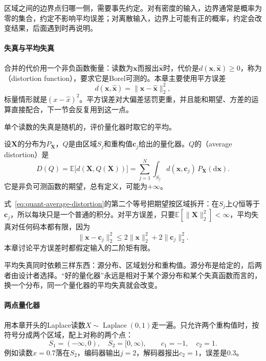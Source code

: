 区域之间的边界点归哪一侧，需要事先约定。对有密度的输入，边界通常是概率为零的集合，约定不影响平均误差；对离散输入，边界上可能有正的概率，约定会改变结果，后面遇到时再说明。

\paragraph{失真与平均失真}

合并的代价用一个非负函数衡量：读数为$\bm{x}$而报出$\hat{\bm{x}}$时，代价是$d(\bm{x},\hat{\bm{x}})\geq0$，称为（distortion function），要求它是Borel可测的。本章主要使用平方误差
\begin{equation}
 d(\bm{x},\hat{\bm{x}})=\lVert\bm{x}-\hat{\bm{x}}\rVert_2^2 ,
 \label{eq:quant-squared-error}
\end{equation}
标量情形就是$(x-\hat{x})^2$。平方误差对大偏差惩罚更重，并且能和期望、方差的运算直接配合，下一节会反复用到这一点。

单个读数的失真是随机的，评价量化器时取它的平均。

\begin{definition}[平均失真]
\label{def:quant-average-distortion}
设$\bm{X}$的分布为$P_{\bm{X}}$，$Q$是由区域$S_j$和重构值$\bm{c}_j$给出的量化器。$Q$的（average distortion）是
\begin{equation}
 D(Q)=\mathbb{E}\bigl[d(\bm{X},Q(\bm{X}))\bigr]=\sum_{j=1}^{N}\int_{S_j}d(\bm{x},\bm{c}_j)\,P_{\bm{X}}(\mathrm{d}\bm{x}) .
 \label{eq:quant-average-distortion}
\end{equation}
它是非负可测函数的期望，总有定义，可能为$+\infty$。
\end{definition}

式~\eqref{eq:quant-average-distortion}的第二个等号把期望按区域拆开：在$S_j$上$Q$恒等于$\bm{c}_j$，所以每块只是一个普通的积分。对平方误差，只要$\mathbb{E}[\lVert\bm{X}\rVert_2^2]<\infty$，平均失真对任何码本都有限，因为
\[
 \lVert\bm{x}-\bm{c}_j\rVert_2^2\leq2\lVert\bm{x}\rVert_2^2+2\lVert\bm{c}_j\rVert_2^2 .
\]
本章讨论平方误差时都假定输入的二阶矩有限。

平均失真同时依赖三样东西：源分布、区域划分和重构值。源分布是给定的，后两者由设计者选择。“好的量化器”永远是相对于某个源分布和某个失真函数而言的，换一个分布，同一个量化器的平均失真就会改变。

\paragraph{两点量化器}
用本章开头的Laplace读数$X\sim\operatorname{Laplace}(0,1)$走一遍。只允许两个重构值时，按符号分成两个区域，配上对称的两个点：
\[
 S_1=(-\infty,0),\quad S_2=[0,\infty),\qquad c_1=-1,\quad c_2=1 .
\]
例如读数$x=0.7$落在$S_2$，编码器输出$j=2$，解码器报出$c_2=1$，误差是$0.3$。

